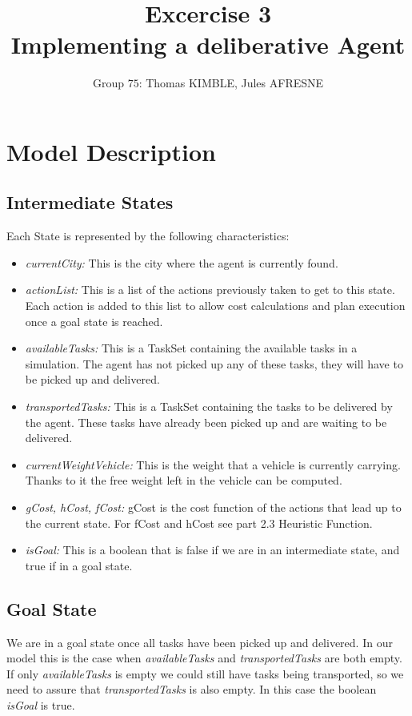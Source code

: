 \documentclass[11pt]{article}
\title{\bf Excercise 3\\ Implementing a deliberative Agent}
\author{Group \textnumero$75$: Thomas KIMBLE, Jules AFRESNE}
\begin{document}
\maketitle

\section{Model Description}

\subsection{Intermediate States}
Each State is represented by the following characteristics:
\begin{itemize}
    \item \textit{currentCity:} This is the city where the agent is currently found.
    \item \textit{actionList:} This is a list of the actions previously taken to get to this state. Each action is added to this list to allow cost calculations and plan execution once a goal state is reached.
    \item \textit{availableTasks:} This is a TaskSet containing the available tasks in a simulation. The agent has not picked up any of these tasks, they will have to be picked up and delivered.
    \item \textit{transportedTasks:} This is a TaskSet containing the tasks to be delivered by the agent. These tasks have already been picked up and are waiting to be delivered.
    \item \textit{currentWeightVehicle:} This is the weight that a vehicle is currently carrying. Thanks to it the free weight left in the vehicle can be computed.
    \item \textit{gCost, hCost, fCost:} gCost is the cost function of the actions that lead up to the current state. For fCost and hCost see part 2.3 Heuristic Function.
    \item \textit{isGoal:} This is a boolean that is false if we are in an intermediate state, and true if in a goal state.
\end{itemize}

\subsection{Goal State}
\indent \indent We are in a goal state once all tasks have been picked up and delivered. In our model this is the case when \textit{availableTasks} and \textit{transportedTasks} are both empty. If only \textit{availableTasks} is empty we could still have tasks being transported, so we need to assure that \textit{transportedTasks} is also empty. In this case the boolean \textit{isGoal} is true.
\end{document}
